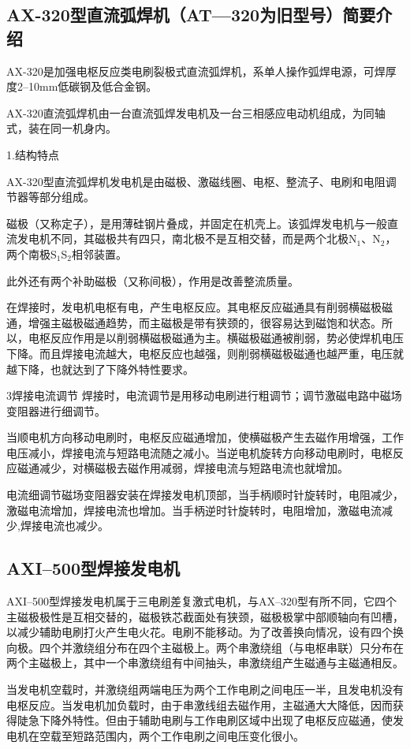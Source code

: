 \documentclass{ctexbook}
\begin{document}
\subsection{AX-320型直流弧焊机（AT—320为旧型号）简要介绍} 
AX-320是加强电枢反应类电刷裂极式直流弧焊机，系单人操作弧焊电源，可焊厚度2--10mm低碳钢及低合金钢。

AX-320直流弧焊机由一台直流弧焊发电机及一台三相感应电动机组成，为同轴式，装在同一机身内。

1.结构特点

AX-320型直流弧焊机发电机是由磁极、激磁线圈、电枢、整流子、电刷和电阻调节器等部分组成。

磁极（又称定子），是用薄硅钢片叠成，并固定在机壳上。该弧焊发电机与一般直流发电机不同，其磁极共有四只，南北极不是互相交替，而是两个北极N$_1$、N$_2$，两个南极S$_1$S$_2$相邻装置。

此外还有两个补助磁极（又称间极），作用是改善整流质量。

在焊接时，发电机电枢有电，产生电枢反应。其电枢反应磁通具有削弱横磁极磁通，增强主磁极磁通趋势，而主磁极是带有狭颈的，很容易达到磁饱和状态。所以，电枢反应作用是以削弱横磁极磁通为主。横磁极磁通被削弱，势必使焊机电压下降。而且焊接电流越大，电枢反应也越强，则削弱横磁极磁通也越严重，电压就越下降，也就达到了下降外特性要求。

3焊接电流调节
焊接时，电流调节是用移动电刷进行粗调节；调节激磁电路中磁场变阻器进行细调节。

当顺电机方向移动电刷时，电枢反应磁通增加，使横磁极产生去磁作用增强，工作电压减小，焊接电流与短路电流随之减小。当逆电机旋转方向移动电刷时，电枢反应磁通减少，对横磁极去磁作用减弱，焊接电流与短路电流也就增加。

电流细调节磁场变阻器安装在焊接发电机顶部，当手柄顺时针旋转时，电阻减少，激磁电流增加，焊接电流也增加。当手柄逆时针旋转时，电阻增加，激磁电流减少,焊接电流也减少。
\subsection{AXI--500型焊接发电机}
AXI--500型焊接发电机属于三电刷差复激式电机，与AX--320型有所不同，它四个主磁极极性是互相交替的，磁极铁芯截面处有狭颈，磁极极掌中部顺轴向有凹槽，以减少辅助电刷打火产生电火花。电刷不能移动。为了改善换向情况，设有四个换向极。四个并激绕组分布在四个主磁极上。两个串激绕组（与电枢串联）只分布在两个主磁极上，其中一个串激绕组有中间抽头，串激绕组产生磁通与主磁通相反。

当发电机空载时，并激绕组两端电压为两个工作电刷之间电压一半，且发电机没有电枢反应。当发电机加负载时，由于串激线组去磁作用，主磁通大大降低，因而获得陡急下降外特性。但由于辅助电刷与工作电刷区域中出现了电枢反应磁通，使发电机在空载至短路范围内，两个工作电刷之间电压变化很小。
\end{document}
